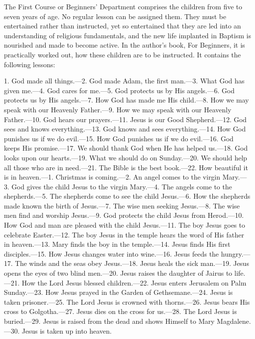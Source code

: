 The First Course or Beginners’ Department comprises the children from five to seven years of age. No regular lesson can be assigned them. They must be entertained rather than instructed, yet so entertained that they are led into an understanding of religious fundamentals, and the new life implanted
in Baptism is nourished and made to become active. In the author’s book, For Beginners, it is practically worked out, how these children are to be instructed. It contains the following lessons:

1. God made all things.—2. God made Adam, the first man.—3. What God has given me.—4. God cares for me.—5. God protects us by His angels.—6. God protects us by His angels.—7. How God has made me His child.—8. How we may speak with our Heavenly Father.—9. How we may speak with our Heavenly Father.—10. God hears our prayers.—11. Jesus is our Good Shepherd.—12. God sees and knows everything.—13. God knows and sees everything.—14. How God punishes us if we do evil.—15. How God punishes us if we do evil.—16. God keeps His promise.—17. We should thank God when He has helped us.—18. God looks upon our hearts.—19. What we should do on Sunday.—20. We should help all those who are in need.—21. The Bible is the best book.—22. How beautiful it is in heaven.—1. Christmas is coming.—2. An angel comes to the virgin Mary.—3. God gives the child Jesus to the virgin Mary.—4. The angels come to the shepherds.—5. The shepherds come to see the child Jesus.—6. How the shepherds made known the birth of Jesus.—7. The wise men seeking Jesus.—8. The wise men find and worship Jesus.—9. God protects the child Jesus from Herod.—10. How God and man are pleased with the child Jesus.—11. The boy Jesus goes to celebrate Easter.—12. The boy Jesus in the temple hears the word of His father in heaven.—13. Mary finds the boy in the temple.—14. Jesus finds His first disciples.—15. How Jesus changes water into wine.—16. Jesus feeds the hungry.—17. The winds and the seas obey Jesus.—18. Jesus heals the sick man.—19. Jesus opens the eyes of two blind men.—20. Jesus raises the daughter of Jairus to life.—21. How the Lord Jesus blessed children.—22. Jesus enters Jerusalem on Palm Sunday.—23. How Jesus prayed in the Garden of Gethsemane.—24. Jesus is taken prisoner.—25. The Lord Jesus is crowned with thorns.—26. Jesus bears His cross to Golgotha.—27. Jesus dies on the cross for us.—28. The Lord Jesus is buried.—29. Jesus is raised from the dead and shows Himself to Mary Magdalene.—30. Jesus is taken up into heaven.

